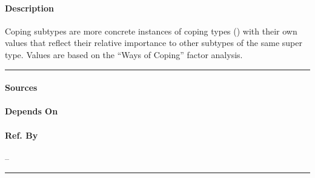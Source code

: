 \paragraph{Description} Coping subtypes are more concrete instances of
coping types () with their own values that reflect
their relative importance to other subtypes of the same super type. Values
are based on the ``Ways of Coping'' factor analysis. \\\hrule

\paragraph{Sources} \cite{copingquestions}

\paragraph{Depends On} 

\paragraph{Ref. By} -- \\\hrule\vspace{0.5mm}